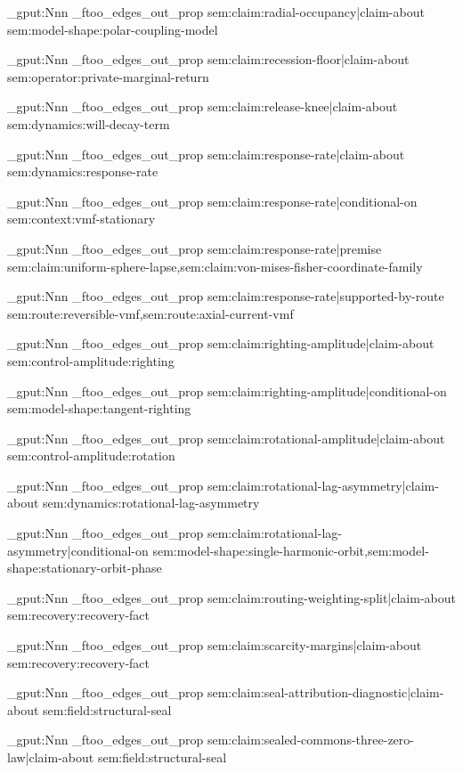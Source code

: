 \prop_gput:Nnn \g_ftoo_edges_out_prop { sem:claim:radial-occupancy|claim-about } { sem:model-shape:polar-coupling-model }

\prop_gput:Nnn \g_ftoo_edges_out_prop { sem:claim:recession-floor|claim-about } { sem:operator:private-marginal-return }

\prop_gput:Nnn \g_ftoo_edges_out_prop { sem:claim:release-knee|claim-about } { sem:dynamics:will-decay-term }

\prop_gput:Nnn \g_ftoo_edges_out_prop { sem:claim:response-rate|claim-about } { sem:dynamics:response-rate }

\prop_gput:Nnn \g_ftoo_edges_out_prop { sem:claim:response-rate|conditional-on } { sem:context:vmf-stationary }

\prop_gput:Nnn \g_ftoo_edges_out_prop { sem:claim:response-rate|premise } { sem:claim:uniform-sphere-lapse,sem:claim:von-mises-fisher-coordinate-family }

\prop_gput:Nnn \g_ftoo_edges_out_prop { sem:claim:response-rate|supported-by-route } { sem:route:reversible-vmf,sem:route:axial-current-vmf }

\prop_gput:Nnn \g_ftoo_edges_out_prop { sem:claim:righting-amplitude|claim-about } { sem:control-amplitude:righting }

\prop_gput:Nnn \g_ftoo_edges_out_prop { sem:claim:righting-amplitude|conditional-on } { sem:model-shape:tangent-righting }

\prop_gput:Nnn \g_ftoo_edges_out_prop { sem:claim:rotational-amplitude|claim-about } { sem:control-amplitude:rotation }

\prop_gput:Nnn \g_ftoo_edges_out_prop { sem:claim:rotational-lag-asymmetry|claim-about } { sem:dynamics:rotational-lag-asymmetry }

\prop_gput:Nnn \g_ftoo_edges_out_prop { sem:claim:rotational-lag-asymmetry|conditional-on } { sem:model-shape:single-harmonic-orbit,sem:model-shape:stationary-orbit-phase }

\prop_gput:Nnn \g_ftoo_edges_out_prop { sem:claim:routing-weighting-split|claim-about } { sem:recovery:recovery-fact }

\prop_gput:Nnn \g_ftoo_edges_out_prop { sem:claim:scarcity-margins|claim-about } { sem:recovery:recovery-fact }

\prop_gput:Nnn \g_ftoo_edges_out_prop { sem:claim:seal-attribution-diagnostic|claim-about } { sem:field:structural-seal }

\prop_gput:Nnn \g_ftoo_edges_out_prop { sem:claim:sealed-commons-three-zero-law|claim-about } { sem:field:structural-seal }

